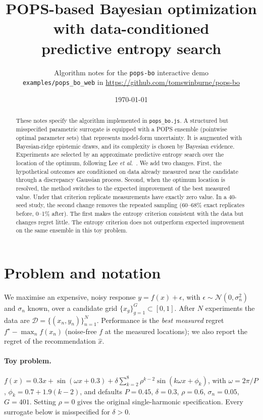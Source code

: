\documentclass[11pt,a4paper]{article}
\title{POPS-based Bayesian optimization with data-conditioned\\predictive entropy search}
\author{Algorithm notes for the \texttt{pops-bo} interactive demo\\\small\texttt{examples/pops\_bo\_web} in \url{https://github.com/tomswinburne/pops-bo}}
\date{\today}
\newcommand{\N}{\mathcal{N}}
\begin{document}
\maketitle

\begin{abstract}
These notes specify the algorithm implemented in \texttt{pops\_bo.js}. A structured but
misspecified parametric surrogate is equipped with a POPS ensemble (pointwise optimal parameter
sets) that represents model-form uncertainty. It is augmented with Bayesian-ridge epistemic draws, and
its complexity is chosen by Bayesian evidence. Experiments are selected by an approximate
predictive entropy search over the location of the optimum, following Lee \emph{et al.}~\cite{lee2026}.
We add two changes. First, the hypothetical outcomes are conditioned on data already measured near
the candidate through a discrepancy Gaussian process. Second, when the optimum location is resolved,
the method switches to the expected improvement of the best measured value. Under that criterion
replicate measurements have exactly zero value. In a 40-seed study, the second change removes the repeated sampling
(60--68\% exact replicates before, 0--1\% after). The first makes the entropy criterion consistent with the data but changes regret
little. The entropy criterion does not outperform expected improvement on the same ensemble in this toy problem.
\end{abstract}

\section{Problem and notation}
We maximise an expensive, noisy response $y = f(x) + \epsilon$, with $\epsilon\sim\N(0,\sigma_n^2)$ and
$\sigma_n$ known, over a candidate grid $\{x_g\}_{g=1}^{G}\subset[0,1]$. After $N$ experiments the data are
$\mathcal D = \{(x_n,y_n)\}_{n=1}^N$. Performance is the \emph{best measured} regret
$f^\star - \max_n f(x_n)$ (noise-free $f$ at the measured locations); we also report the regret of the
recommendation $\hat x$.

\paragraph{Toy problem.} $f(x) = 0.3x + \sin(\omega x + 0.3) + \delta\sum_{k=2}^{8}\rho^{k-2}\sin(k\omega x + \phi_k)$,
with $\omega = 2\pi/P$, $\phi_k = 0.7 + 1.9(k-2)$, and defaults $P=0.45$, $\delta=0.3$, $\rho=0.6$, $\sigma_n=0.05$, $G=401$.
Setting $\rho=0$ gives the original single-harmonic specification. Every surrogate below is misspecified for $\delta>0$.
\end{document}

